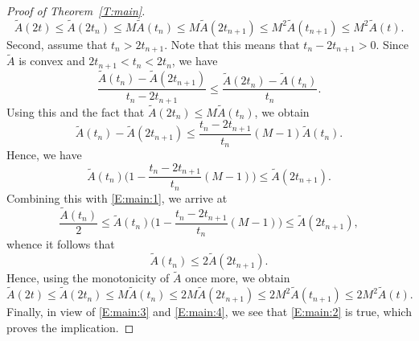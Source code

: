 \documentclass[nointlimits]{amsart}
\numberwithin{equation}{section}
\theoremstyle{plain}
\theoremstyle{definition}
\newcommand{\tA}{\tilde{A}}
\begin{document}
\begin{proof}[Proof of Theorem~\ref{T:main}]
\begin{equation}
    \tA(2t)  \leq \tA(2t_n) \leq M \tA(t_n)
    \leq M \tA(2t_{n+1})
    \leq M^2 \tA(t_{n+1}) \leq M^2 \tA(t).
\end{equation}
Second, assume that $t_n > 2t_{n+1}$. Note that this means that $t_n - 2t_{n+1} > 0$. Since $\tA$ is convex and $2t_{n+1} < t_n < 2t_n$, we have
\begin{equation*}
    \frac{\tA(t_n)  - \tA(2t_{n+1})}{t_n - 2t_{n+1}} \leq \frac{\tA(2t_n)  - \tA(t_n)}{t_n}.
\end{equation*}
Using this and the fact that $\tA(2t_n) \leq M \tA(t_n)$, we obtain
\begin{equation*}
    \tA(t_n) - \tA(2t_{n+1})\leq \frac{t_n - 2t_{n+1}}{t_n} (M-1)\tA(t_n).
\end{equation*}
Hence, we have
\begin{equation*}
    \tA(t_n) \Big(1 -  \frac{t_n - 2t_{n+1}}{t_n} (M-1)\Big) \leq \tA(2t_{n+1}).
\end{equation*}
Combining this with \eqref{E:main:1}, we arrive at
\begin{equation*}
   \frac{\tA(t_n)}{2} \leq \tA(t_n) \Big(1 -  \frac{t_n - 2t_{n+1}}{t_n} (M-1)\Big) \leq \tA(2t_{n+1}),
\end{equation*}
whence it follows that
\begin{equation*}
    \tA(t_n) \leq 2 \tA(2t_{n+1}).
\end{equation*}
Hence, using the monotonicity of $\tA$ once more, we obtain
\begin{equation}\label{E:main:4}
    \tA(2t)  \leq \tA(2t_n) \leq M \tA(t_n) \leq 2M \tA(2t_{n+1})
    \leq 2M^2 \tA(t_{n+1})
\leq 2M^2 \tA(t).
\end{equation}
Finally, in view of \eqref{E:main:3} and \eqref{E:main:4}, we see that \eqref{E:main:2} is true, which proves the implication.


\end{proof}
\end{document}
